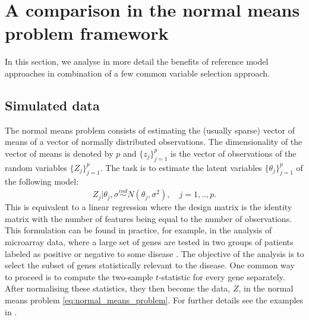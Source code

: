 \documentclass[american,]{article}
\theoremstyle{definition}
\begin{document}
\hypertarget{comparison}{%
\section{A comparison in the normal means problem framework}\label{comparison}}

In this section, we analyse in more detail the benefits of reference
model approaches in combination of a few common variable selection
approach.

\subsection{Simulated data}

The normal means problem consists of estimating the (usually
sparse) vector of means of a vector of normally distributed
observations. The dimensionality of the vector of means is denoted by
$p$ and $\{z_{j}\}_{j=1}^{p}$ is the vector of observations of the
random variables $\{Z_{j}\}_{j=1}^{p}$. The task is to estimate the
latent variables $\{\theta_{j}\}_{j=1}^{p}$ of the following model: \
\begin{equation}\label{eq:normal_means_problem}
Z_{j}|\theta_{j},\sigma\overset{ind}{\sim}N(\theta_{j},\sigma^{2}), \quad j=1,..,p.
\end{equation}
This is equivalent to a linear regression where the design matrix is
the identity matrix with the number of features being equal to the
number of observations. This formulation can be found in practice, for
example, in the analysis of microarray data, where a large set of
genes are tested in two groups of patients labeled as positive or
negative to some disease \citep{paper:efron,efron2012large}. The
objective of the analysis is to select the subset of genes
statistically relevant to the disease. One common way to proceed is to
compute the two-sample $t$-statistic for every gene separately.  After
normalising these statistics, they then become the data, $Z$, in the
normal means problem \eqref{eq:normal_means_problem}. For further
details see the examples in \cite{paper:efron, efron2012large}.
\end{document}
